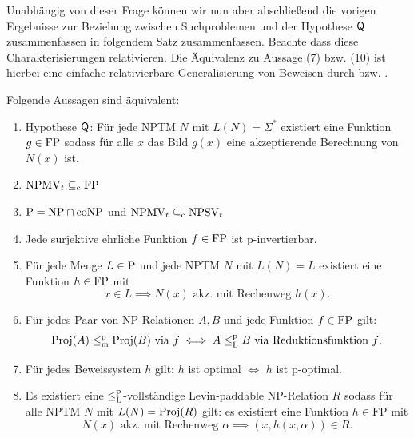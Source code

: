 
Unabhängig von dieser Frage können wir nun aber abschließend die vorigen Ergebnisse zur Beziehung zwischen Suchproblemen und der Hypothese $\hQ$ zusammenfassen in folgendem Satz zusammenfassen.
Beachte dass diese Charakterisierungen relativieren.
Die Äquivalenz zu Aussage (7) bzw. (10) ist hierbei eine einfache relativierbare Generalisierung von Beweisen durch \textcite[Thm.~5.3]{messner_simulation_2001} bzw. \textcite{fenner_inverting_2003}.

\begin{theorem}\label{thm:q}
    Folgende Aussagen sind äquivalent:
    \begin{enumerate}
        \item Hypothese $\hQ$: Für jede NPTM $N$ mit $L(N)=\Sigma^*$ existiert eine Funktion $g\in\FP$ sodass für alle $x$ das Bild $g(x)$ eine akzeptierende Berechnung von $N(x)$ ist.
        \item $\mathrm{NPMV}_t\subseteqc \mathrm{FP}$
        \item $\P=\NP\cap\coNP$ und $\mathrm{NPMV}_t\subseteqc \mathrm{NPSV}_t$
        \item Jede surjektive ehrliche Funktion $f\in\FP$ ist p-invertierbar. %
        \item Für jede Menge $L\in \P$  und jede NPTM $N$ mit $L(N)=L$ existiert eine Funktion $h\in \FP$ mit 
            \[ x\in L \implies N(x) \text{ akz. mit Rechenweg $h(x)$}. \]
        \item Für jedes Paar von NP-Relationen $A, B$ und jede Funktion $f\in\FP$ gilt:
            \[ \Proj(A) \leqmp \Proj(B) \text{ via $f$} \iff A \leqlp B \text{ via Reduktionsfunktion $f$}. \]
        \item Für jedes Beweissystem $h$ gilt: $h$ ist optimal $\iff$ $h$ ist p-optimal. 
        \item Es existiert eine $\leqlp$-vollständige Levin-paddable NP-Relation $R$ sodass für alle NPTM $N$ mit $L(N)=\Proj(R)$ gilt: es existiert eine Funktion $h\in\mathrm{FP}$ mit
            \[ N(x) \text{ akz. mit Rechenweg $\alpha$} \implies (x,h(x,\alpha))\in R. \]

\end{enumerate}
\end{theorem}
